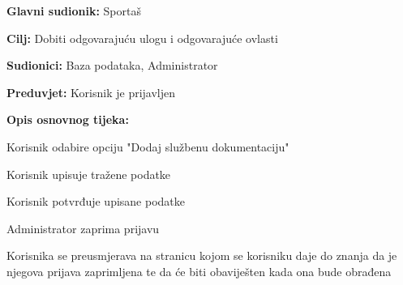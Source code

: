 					\noindent {}
					\begin{packed_item}
						
						\item \textbf{Glavni sudionik: }Sportaš
						\item  \textbf{Cilj:} Dobiti odgovarajuću ulogu i odgovarajuće ovlasti
						\item  \textbf{Sudionici:} Baza podataka, Administrator
						\item  \textbf{Preduvjet:} Korisnik je prijavljen
						\item  \textbf{Opis osnovnog tijeka:}
						
						\item[] \begin{packed_enum}
							
							\item Korisnik odabire opciju "Dodaj službenu dokumentaciju"
							\item Korisnik upisuje tražene podatke
							\item Korisnik potvrđuje upisane podatke
							\item Administrator zaprima prijavu
							\item Korisnika se preusmjerava na stranicu kojom se korisniku daje do znanja da je njegova prijava zaprimljena te da će biti obaviješten kada ona bude obrađena
							
						\end{packed_enum}
						
					\end{packed_item}
					
%						
						
							
						
